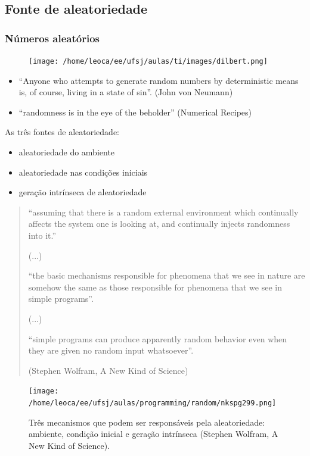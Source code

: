 \subsection{Fonte de aleatoriedade}
\begin{frame}
  \frametitle{Números aleatórios}

        \begin{figure}[h!]
        \centering
        \texttt{[image: /home/leoca/ee/ufsj/aulas/ti/images/dilbert.png]}
        \label{fig:dilbert-random}
        \end{figure}

  \begin{itemize}
  \item ``Anyone who attempts to generate random numbers by deterministic means is,
          of course, living in a state of sin''. (John von Neumann)
  \item ``randomness is in the eye of the beholder'' (Numerical Recipes)
  \end{itemize}

  As três fontes de aleatoriedade:
  \begin{itemize}
  \item aleatoriedade do ambiente
  \item aleatoriedade nas condições iniciais
  \item geração intrínseca de aleatoriedade
  \end{itemize}

  \begin{quote}
  ``assuming that there is a random external environment which
    continually affects the system one is looking at, and continually
    injects randomness into it.''

    (...)

  ``the basic mechanisms responsible for phenomena that we see in nature are
    somehow the same as those responsible for phenomena that we see
    in simple programs''.

    (...)

  ``simple programs can produce apparently random behavior even when they are given no random input whatsoever''.

  (Stephen Wolfram, A New Kind of Science)
  \end{quote}

  \begin{figure}[h!]
  \centering
  \texttt{[image: /home/leoca/ee/ufsj/aulas/programming/random/nkspg299.png]}
  \caption{Três mecanismos que podem ser responsáveis pela aleatoriedade: ambiente, condição inicial e
          geração intrínseca (Stephen Wolfram, A New Kind of Science).}
  \label{fig:nkspg299}
  \end{figure}


\end{frame}
